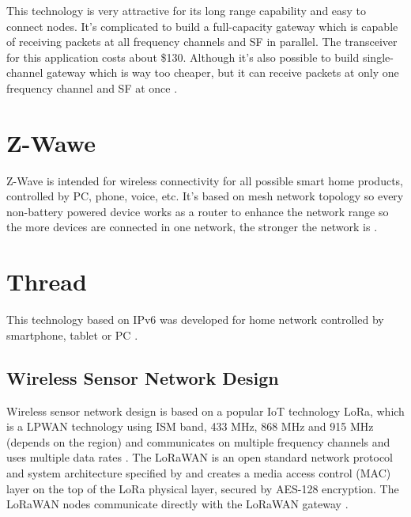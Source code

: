 This technology is very attractive for its long range capability and easy to connect nodes. It's complicated to build a full-capacity gateway which is capable of receiving packets at all frequency channels and SF in parallel. The transceiver for this application costs about \$130. Although it's also possible to build single-channel gateway which is way too cheaper, but it can receive packets at only one frequency channel and SF at once \cite{17} \cite{18} \cite{19} \cite{20} \cite{21} \cite{22} \cite{23} \cite{24}.


\section{Z-Wawe}
Z-Wave is intended for wireless connectivity for all possible smart home products, controlled by PC, phone, voice, etc. It's based on mesh network topology so every non-battery powered device works as a router to enhance the network range so the more devices are connected in one network, the stronger the network is \cite{27} \cite{28}.


\section{Thread}
This technology based on IPv6 was developed for home network controlled by smartphone, tablet or PC \cite{29} \cite{30} \cite{31}.








\subsection{Wireless Sensor Network Design}
Wireless sensor network design is based on a popular IoT technology LoRa, which is a LPWAN technology using ISM band, 433 MHz, 868 MHz and 915 MHz (depends on the region) and communicates on multiple frequency channels and uses multiple data rates \cite{LoRaWAN Evaluation for IoT Communications}.
The LoRaWAN is an open standard network protocol and system architecture specified by \cite{LoRaWAN specification} and creates a media access control (MAC) layer on the top of the LoRa physical layer, secured by AES-128 encryption.
The LoRaWAN nodes communicate directly with the LoRaWAN gateway \cite{Internet of Things (IoT) using LoRa technology}.


